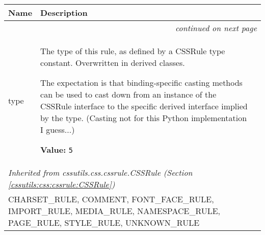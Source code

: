     \vspace{-1cm}
\hspace{\varindent}\begin{longtable}{|p{\varnamewidth}|p{\vardescrwidth}|l}
\cline{1-2}
\cline{1-2} \centering \textbf{Name} & \centering \textbf{Description}& \\
\cline{1-2}
\endhead\cline{1-2}\multicolumn{3}{r}{\small\textit{continued on next page}}\\\endfoot\cline{1-2}
\endlastfoot\raggedright t\-y\-p\-e\- & \raggedright The type of this rule, as defined by a CSSRule type constant.
Overwritten in derived classes.

The expectation is that binding-specific casting methods can be used to
cast down from an instance of the CSSRule interface to the specific
derived interface implied by the type.
(Casting not for this Python implementation I guess...)

\textbf{Value:} 
{\tt 5}&\\
\cline{1-2}
\multicolumn{2}{|l|}{\textit{Inherited from cssutils.css.cssrule.CSSRule \textit{(Section \ref{cssutils:css:cssrule:CSSRule})}}}\\
\multicolumn{2}{|p{\varwidth}|}{\raggedright CHARSET\_RULE, COMMENT, FONT\_FACE\_RULE, IMPORT\_RULE, MEDIA\_RULE, NAMESPACE\_RULE, PAGE\_RULE, STYLE\_RULE, UNKNOWN\_RULE}\\
\cline{1-2}
\end{longtable}

